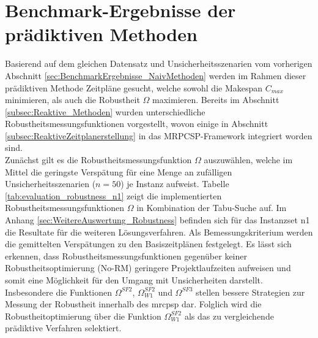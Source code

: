 \section{Benchmark-Ergebnisse der prädiktiven Methoden}
\label{sec:BenchmarkErgebnisse_PraediktiveMethoden}

Basierend auf dem gleichen Datensatz und Unsicherheitsszenarien vom vorherigen Abschnitt \ref{sec:BenchmarkErgebnisse_NaivMethoden} werden im Rahmen dieser prädiktiven Methode Zeitpläne gesucht, welche sowohl die Makespan $C_{max}$ minimieren, als auch die Robustheit $\Omega$ maximieren. Bereits im Abschnitt \ref{subsec:Reaktive_Methoden} wurden unterschiedliche Robustheitsmessungsfunktionen vorgestellt, wovon einige in Abschnitt \ref{subsec:ReaktiveZeitplanerstellung} in das MRPCSP-Framework integriert worden sind. \\

Zunächst gilt es die Robustheitsmessungsfunktion $\Omega$ auszuwählen, welche im Mittel die geringste Verspätung für eine Menge an zufälligen Unsicherheitsszenarien ($n = 50$) je Instanz aufweist. Tabelle \ref{tab:evaluation_robustness_n1} zeigt die implementierten Robustheitsmessungsfunktionen $\Omega$ in Kombination der Tabu-Suche auf. Im Anhang \ref{sec:WeitereAuswertung_Robustness} befinden sich für das Instanzset n1 die Resultate für die weiteren Lösungsverfahren. Als Bemessungskriterium werden die gemittelten Verspätungen zu den Basiszeitplänen festgelegt. Es lässt sich erkennen, dass Robustheitsmessungsfunktionen gegenüber keiner Robustheitsoptimierung (No-RM) geringere Projektlaufzeiten aufweisen und somit eine Möglichkeit für den Umgang mit Unsicherheiten darstellt. Insbesondere die Funktionen $\Omega^{SF2}$, $\Omega^{SF2}_{W1}$ und $\Omega^{SF3}$ stellen bessere Strategien zur Messung der Robustheit innerhalb des \ac{mrcpsp} dar. Folglich wird die Robustheitoptimierung über die Funktion $\Omega^{SF2}_{W1}$ als das zu vergleichende prädiktive Verfahren selektiert. \\

